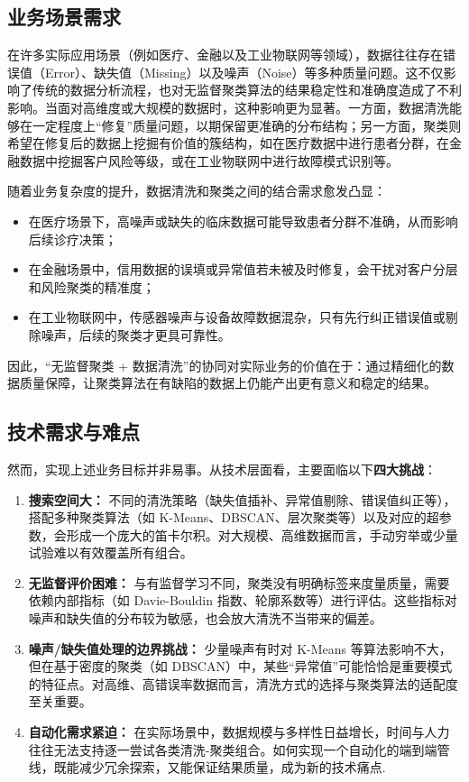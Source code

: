 \documentclass[10pt]{article} %
\numberwithin{equation}{section}
\begin{document}
\subsection{业务场景需求}\label{subsec:business-scenario}
在许多实际应用场景（例如医疗、金融以及工业物联网等领域），数据往往存在错误值（Error）、缺失值（Missing）以及噪声（Noise）等多种质量问题\cite{SantosArteaga2024,Zhou2020,Li2023,Lin2024}。这不仅影响了传统的数据分析流程，也对无监督聚类算法的结果稳定性和准确度造成了不利影响。当面对高维度或大规模的数据时，这种影响更为显著。一方面，数据清洗能够在一定程度上“修复”质量问题，以期保留更准确的分布结构；另一方面，聚类则希望在修复后的数据上挖掘有价值的簇结构，如在医疗数据中进行患者分群，在金融数据中挖掘客户风险等级，或在工业物联网中进行故障模式识别等。  
\vspace{0.3em}

随着业务复杂度的提升，数据清洗和聚类之间的结合需求愈发凸显：   
\begin{itemize}
    \item 在医疗场景下，高噪声或缺失的临床数据可能导致患者分群不准确，从而影响后续诊疗决策；
    \item 在金融场景中，信用数据的误填或异常值若未被及时修复，会干扰对客户分层和风险聚类的精准度；
    \item 在工业物联网中，传感器噪声与设备故障数据混杂，只有先行纠正错误值或剔除噪声，后续的聚类才更具可靠性。  
\end{itemize}
因此，“无监督聚类 + 数据清洗”的协同对实际业务的价值在于：通过精细化的数据质量保障，让聚类算法在有缺陷的数据上仍能产出更有意义和稳定的结果。

\subsection{技术需求与难点}\label{subsec:tech-challenges}
然而，实现上述业务目标并非易事。从技术层面看，主要面临以下\textbf{四大挑战}：
\begin{enumerate}
    \item \textbf{搜索空间大：} 
    不同的清洗策略（缺失值插补、异常值剔除、错误值纠正等），搭配多种聚类算法（如 K-Means、DBSCAN、层次聚类等）以及对应的超参数，会形成一个庞大的笛卡尔积。对大规模、高维数据而言，手动穷举或少量试验难以有效覆盖所有组合\cite{10346079}。

    \item \textbf{无监督评价困难：}
    与有监督学习不同，聚类没有明确标签来度量质量，需要依赖内部指标（如 Davie-Bouldin 指数、轮廓系数等）进行评估。这些指标对噪声和缺失值的分布较为敏感，也会放大清洗不当带来的偏差\cite{Atif2024,Sloutsky2012}。

    \item \textbf{噪声/缺失值处理的边界挑战：}
    少量噪声有时对 K-Means 等算法影响不大\cite{app112311202}，但在基于密度的聚类（如 DBSCAN）中，某些“异常值”可能恰恰是重要模式的特征点。对高维、高错误率数据而言，清洗方式的选择与聚类算法的适配度至关重要\cite{Ni2023}。

    \item \textbf{自动化需求紧迫：}
    在实际场景中，数据规模与多样性日益增长，时间与人力往往无法支持逐一尝试各类清洗-聚类组合。如何实现一个自动化的端到端管线，既能减少冗余探索，又能保证结果质量，成为新的技术痛点\cite{Bahmani2021ToTune,9458702}.
\end{enumerate}
\end{document}
